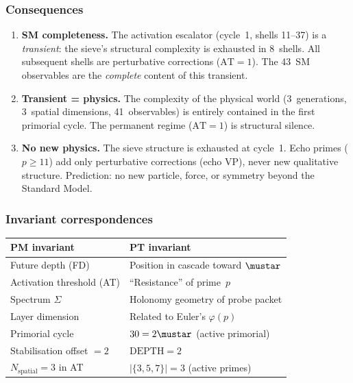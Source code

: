 \documentclass[12pt,a4paper]{article}
\begin{document}
\subsubsection{Consequences}

\begin{enumerate}[nosep]
  \item \textbf{SM completeness.}  The activation escalator (cycle~1, shells
    11--37) is a \emph{transient}: the sieve's structural complexity is
    exhausted in 8~shells.  All subsequent shells are perturbative corrections
    ($\mathrm{AT} = 1$).  The 43~SM observables are the \emph{complete}
    content of this transient.

  \item \textbf{Transient = physics.}  The complexity of the physical world
    (3~generations, 3~spatial dimensions, 41~observables) is entirely contained
    in the first primorial cycle.  The permanent regime ($\mathrm{AT} = 1$) is
    structural silence.

  \item \textbf{No new physics.}  The sieve structure is exhausted at cycle~1.
    Echo primes ($p \ge 11$) add only perturbative corrections (echo VP),
    never new qualitative structure.  Prediction: no new particle, force, or
    symmetry beyond the Standard Model.
\end{enumerate}

\subsubsection{Invariant correspondences}

\begin{center}
\begin{tabular}{ll}
\toprule
\textbf{PM invariant} & \textbf{PT invariant} \\
\midrule
Future depth (FD) & Position in cascade toward $\mustar$ \\
Activation threshold (AT) & ``Resistance'' of prime~$p$ \\
Spectrum $\Sigma$ & Holonomy geometry of probe packet \\
Layer dimension & Related to Euler's $\varphi(p)$ \\
Primorial cycle & $30 = 2\mustar$ (active primorial) \\
Stabilisation offset $= 2$ & $\mathrm{DEPTH} = 2$ \\
$N_{\mathrm{spatial}} = 3$ in AT & $|\{3, 5, 7\}| = 3$ (active primes) \\
\bottomrule
\end{tabular}
\end{center}
\end{document}
